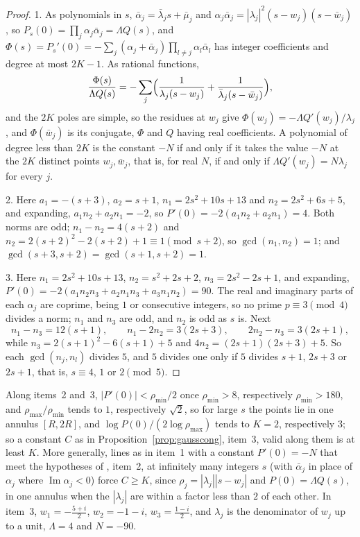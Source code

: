 \documentclass[11pt]{article}
\begin{document}
\begin{proof}
1.  As polynomials in $s$, $\bar\alpha_j=\bar\lambda_js+\bar\mu_j$ and
$\alpha_j\bar\alpha_j=|\lambda_j|^2(s-w_j)(s-\bar w_j)$, so
$P_s(0)=\prod_j\alpha_j\bar\alpha_j=\Lambda Q(s)$, and
$\Phi(s)=P_s'(0)=-\sum_j(\alpha_j+\bar\alpha_j)\prod_{l\ne j}\alpha_l\bar\alpha_l$
has integer coefficients and degree at most $2K-1$.  As rational functions,
\[
  \frac{\Phi(s)}{\Lambda Q(s)}=-\sum_j\Bigl(\frac1{\lambda_j(s-w_j)}
  +\frac1{\bar\lambda_j(s-\bar w_j)}\Bigr),
\]
and the $2K$ poles are simple, so the residues at $w_j$ give
$\Phi(w_j)=-\Lambda Q'(w_j)/\lambda_j$, and $\Phi(\bar w_j)$ is its conjugate,
$\Phi$ and $Q$ having real coefficients.  A polynomial of degree less than
$2K$ is the constant $-N$ if and only if it takes the value $-N$ at the $2K$
distinct points $w_j,\bar w_j$, that is, for real $N$, if and only if
$\Lambda Q'(w_j)=N\lambda_j$ for every $j$.

2.  Here $a_1=-(s+3)$, $a_2=s+1$, $n_1=2s^2+10s+13$ and $n_2=2s^2+6s+5$, and
expanding, $a_1n_2+a_2n_1=-2$, so $P'(0)=-2(a_1n_2+a_2n_1)=4$.  Both norms
are odd; $n_1-n_2=4(s+2)$ and $n_2=2(s+2)^2-2(s+2)+1\equiv1\pmod{s+2}$, so
$\gcd(n_1,n_2)=1$; and $\gcd(s+3,s+2)=\gcd(s+1,s+2)=1$.

3.  Here $n_1=2s^2+10s+13$, $n_2=s^2+2s+2$, $n_3=2s^2-2s+1$, and expanding,
$P'(0)=-2(a_1n_2n_3+a_2n_1n_3+a_3n_1n_2)=90$.  The real and imaginary parts
of each $\alpha_j$ are coprime, being $1$ or consecutive integers, so no
prime $p\equiv3\pmod4$ divides a norm; $n_1$ and $n_3$ are odd, and $n_2$ is
odd as $s$ is.  Next
\[
  n_1-n_3=12(s+1),\qquad n_1-2n_2=3(2s+3),\qquad 2n_2-n_3=3(2s+1),
\]
while $n_3=2(s+1)^2-6(s+1)+5$ and $4n_2=(2s+1)(2s+3)+5$.  So each
$\gcd(n_j,n_l)$ divides $5$, and $5$ divides one only if $5$ divides $s+1$,
$2s+3$ or $2s+1$, that is, $s\equiv4$, $1$ or $2\pmod5$.
\end{proof}

Along items~2 and~3, $|P'(0)|<\rho_{\min}/2$ once $\rho_{\min}>8$, respectively
$\rho_{\min}>180$, and $\rho_{\max}/\rho_{\min}$ tends to $1$, respectively
$\sqrt2$, so for large $s$ the points lie in one annulus $[R,2R]$, and
$\log P(0)/(2\log\rho_{\max})$ tends to $K=2$, respectively $3$; so a
constant $C$ as in Proposition~\ref{prop:gausscong}, item~3, valid along
them is at least $K$.  More generally, lines as in item~1 with a constant
$P'(0)=-N$ that meet the hypotheses of \cite[Proposition~5.3]{coefficient-mass-sectors},
item~2, at infinitely many integers $s$ (with $\bar\alpha_j$ in place of
$\alpha_j$ where $\operatorname{Im}\alpha_j<0$) force $C\ge K$, since
$\rho_j=|\lambda_j||s-w_j|$ and $P(0)=\Lambda Q(s)$, in one annulus when the
$|\lambda_j|$ are within a factor less than $2$ of each other.  In item~3,
$w_1=-\frac{5+i}2$, $w_2=-1-i$, $w_3=\frac{1-i}2$, and $\lambda_j$ is the
denominator of $w_j$ up to a unit, $\Lambda=4$ and $N=-90$.
\end{document}
